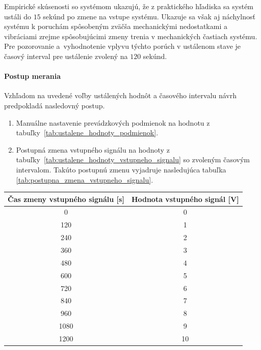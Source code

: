 \documentclass[a4paper, 10pt, ]{article}
\begin{document}
Empirické skúsenosti so systémom ukazujú, že z praktického hľadiska sa systém ustáli do $15$ sekúnd po zmene na vstupe systému. Ukazuje sa však aj náchylnosť systému k poruchám spôsobeným zväčša mechanickými nedostatkami a vibráciami zrejme spôsobujúcimi zmeny trenia v mechanických častiach systému. Pre pozorovanie a~vyhodnotenie vplyvu týchto porúch v ustálenom stave je časový interval pre ustálenie zvolený na $120$ sekúnd.



\paragraph{Postup merania}

Vzhľadom na uvedené voľby ustálených hodnôt a časového intervalu návrh predpokladá nasledovný postup.

\begin{enumerate}[leftmargin=0pt, labelsep=4mm, itemsep=0pt]
    \item Manuálne nastavenie prevádzkových podmienok na hodnotu z tabuľky~\ref{tab:ustalene_hodnoty_podmienok}.
    \item Postupná zmena vstupného signálu na hodnoty z tabuľky~\ref{tab:ustalene_hodnoty_vstupneho_signalu} so zvoleným časovým intervalom. Takúto postupnú zmenu vyjadruje nasledujúca tabuľka \ref{tab:postupna_zmena_vstupneho_signalu}.
    
\end{enumerate}


\begin{center}

\vspace{-10pt}    

\label{tab:postupna_zmena_vstupneho_signalu}

\lstyle

\begin{tabular*}{\textwidth}{@{ \extracolsep{\fill}} cc}
\toprule
Čas zmeny vstupného signálu [s] & Hodnota vstupného signál [V] \\
\midrule
0 & 0 \\
120 & 1 \\
240 & 2 \\
360 & 3 \\
480 & 4 \\
600 & 5 \\
720 & 6 \\
840 & 7 \\
960 & 8 \\
1080 & 9 \\
1200 & 10 \\
\bottomrule
\end{tabular*}

\end{center}
\end{document}
